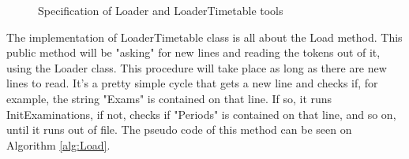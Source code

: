 \begin{figure}[t!]
\centering
{}

\caption{Specification of Loader and LoaderTimetable tools} \label{fig:Loaders}
\end{figure}
The implementation of LoaderTimetable class is all about the Load method. This public method will be "asking" for new lines and reading the tokens out of it, using the Loader class. This procedure will take place as long as there are new lines to read. It's a pretty simple cycle that gets a new line and checks if, for example, the string "Exams" is contained on that line. If so, it runs InitExaminations, if not, checks if "Periods" is contained on that line, and so on, until it runs out of file. The pseudo code of this method can be seen on Algorithm \ref{alg:Load}.\\\\
